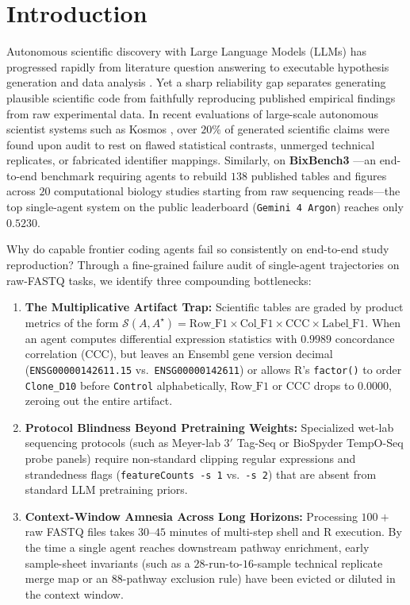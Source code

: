 \documentclass[10pt,twocolumn]{article}
\begin{document}
\section{Introduction}

Autonomous scientific discovery with Large Language Models (LLMs) has progressed rapidly from literature question answering to executable hypothesis generation and data analysis \cite{huang2025popper,mitchener2025kosmos,edison2026bixbench3}. Yet a sharp reliability gap separates generating plausible scientific code from faithfully reproducing published empirical findings from raw experimental data. In recent evaluations of large-scale autonomous scientist systems such as Kosmos \cite{mitchener2025kosmos}, over $20\%$ of generated scientific claims were found upon audit to rest on flawed statistical contrasts, unmerged technical replicates, or fabricated identifier mappings. Similarly, on \textbf{BixBench3} \cite{edison2026bixbench3}---an end-to-end benchmark requiring agents to rebuild $138$ published tables and figures across $20$ computational biology studies starting from raw sequencing reads---the top single-agent system on the public leaderboard (\texttt{Gemini 4 Argon}) reaches only $0.5230$.

Why do capable frontier coding agents fail so consistently on end-to-end study reproduction? Through a fine-grained failure audit of single-agent trajectories on raw-FASTQ tasks, we identify three compounding bottlenecks:
\begin{enumerate}[leftmargin=14pt,itemsep=2pt]
    \item \textbf{The Multiplicative Artifact Trap:} Scientific tables are graded by product metrics of the form $\mathcal{S}(A, A^\star) = \text{Row\_F1} \times \text{Col\_F1} \times \text{CCC} \times \text{Label\_F1}$. When an agent computes differential expression statistics with $0.9989$ concordance correlation ($\text{CCC}$), but leaves an Ensembl gene version decimal (\texttt{ENSG00000142611.15} vs.\ \texttt{ENSG00000142611}) or allows R's \texttt{factor()} to order \texttt{Clone\_D10} before \texttt{Control} alphabetically, $\text{Row\_F1}$ or $\text{CCC}$ drops to $0.0000$, zeroing out the entire artifact.
    \item \textbf{Protocol Blindness Beyond Pretraining Weights:} Specialized wet-lab sequencing protocols (such as Meyer-lab $3'$ Tag-Seq \cite{meyer2011tagseq} or BioSpyder TempO-Seq probe panels) require non-standard clipping regular expressions and strandedness flags (\texttt{featureCounts -s 1} vs.\ \texttt{-s 2}) that are absent from standard LLM pretraining priors.
    \item \textbf{Context-Window Amnesia Across Long Horizons:} Processing $100+$ raw FASTQ files takes $30$--$45$ minutes of multi-step shell and R execution. By the time a single agent reaches downstream pathway enrichment, early sample-sheet invariants (such as a $28$-run-to-$16$-sample technical replicate merge map or an $88$-pathway exclusion rule) have been evicted or diluted in the context window.
\end{enumerate}
\end{document}
